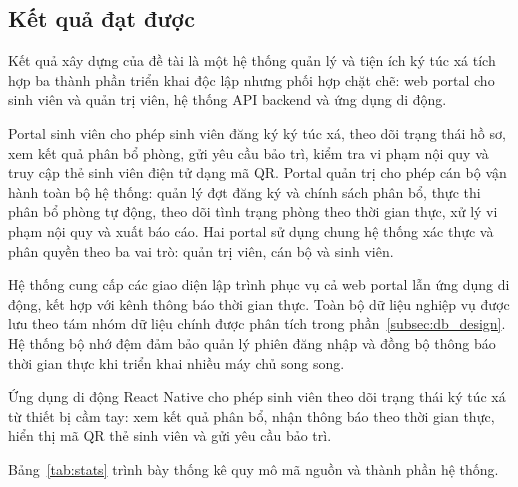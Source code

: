 \documentclass[../DoAn.tex]{subfiles}
\begin{document}
\subsection{Kết quả đạt được}
\label{subsec:results}

Kết quả xây dựng của đề tài là một hệ thống quản lý và tiện ích ký túc xá tích
hợp ba thành phần triển khai độc lập nhưng phối hợp chặt chẽ: web portal cho
sinh viên và quản trị viên, hệ thống API backend và ứng dụng di động.

Portal sinh viên cho phép sinh viên đăng ký ký túc xá, theo dõi trạng thái hồ
sơ, xem kết quả phân bổ phòng, gửi yêu cầu bảo trì, kiểm tra vi phạm nội quy
và truy cập thẻ sinh viên điện tử dạng mã QR. Portal quản trị cho phép cán bộ
vận hành toàn bộ hệ thống: quản lý đợt đăng ký và chính sách phân bổ, thực thi
phân bổ phòng tự động, theo dõi tình trạng phòng theo thời gian thực, xử lý vi
phạm nội quy và xuất báo cáo. Hai portal sử dụng chung hệ thống xác thực và
phân quyền theo ba vai trò: quản trị viên, cán bộ và sinh viên.

Hệ thống cung cấp các giao diện lập trình phục vụ cả web portal lẫn ứng dụng
di động, kết hợp với kênh thông báo thời gian thực. Toàn bộ dữ liệu nghiệp vụ
được lưu theo tám nhóm dữ liệu chính được phân tích trong
phần~\ref{subsec:db_design}. Hệ thống bộ nhớ đệm đảm bảo quản lý phiên đăng
nhập và đồng bộ thông báo thời gian thực khi triển khai nhiều máy chủ song
song.

Ứng dụng di động React Native cho phép sinh viên theo dõi trạng thái ký túc xá
từ thiết bị cầm tay: xem kết quả phân bổ, nhận thông báo theo thời gian thực,
hiển thị mã QR thẻ sinh viên và gửi yêu cầu bảo trì.

Bảng~\ref{tab:stats} trình bày thống kê quy mô mã nguồn và thành phần hệ thống.
\end{document}
